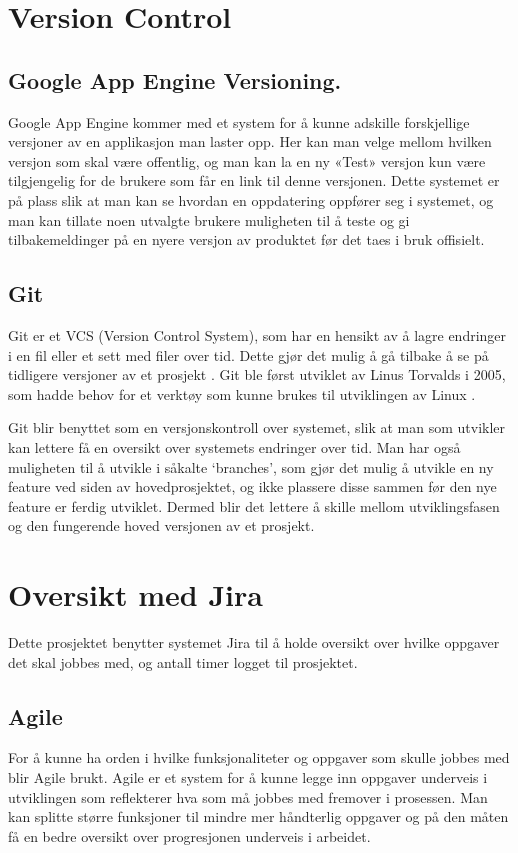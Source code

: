 \section{Version Control}
\subsection{Google App Engine Versioning.}
Google App Engine kommer med et system for å kunne adskille forskjellige versjoner av en applikasjon man laster opp. Her kan man velge mellom hvilken versjon som skal være offentlig, og man kan la en ny «Test» versjon kun være tilgjengelig for de brukere som får en link til denne versjonen. Dette systemet er på plass slik at man kan se hvordan en oppdatering oppfører seg i systemet, og man kan tillate noen utvalgte brukere muligheten til å teste og gi tilbakemeldinger på en nyere versjon av produktet før det taes i bruk offisielt.


\subsection{Git}
Git er et VCS (Version Control System), som har en hensikt av å lagre endringer i en fil eller et sett med filer over tid. Dette gjør det mulig å gå tilbake å se på tidligere versjoner av et prosjekt \citep{git:info}. Git ble først utviklet av Linus Torvalds i 2005, som hadde behov for et verktøy som kunne brukes til utviklingen av Linux \citep{git:history}. 


Git blir benyttet som en versjonskontroll over systemet, slik at man som utvikler kan lettere få en oversikt over systemets endringer over tid. Man har også muligheten til å utvikle i såkalte ‘branches’, som gjør det mulig å utvikle en ny feature ved siden av hovedprosjektet, og ikke plassere disse sammen før den nye feature er ferdig utviklet. Dermed blir det lettere å skille mellom utviklingsfasen og den fungerende hoved versjonen av et prosjekt.


\section{Oversikt med Jira}
Dette  prosjektet benytter systemet Jira til å holde oversikt over hvilke oppgaver det skal jobbes med, og antall timer logget  til prosjektet.

\subsection{Agile}
For å kunne ha orden i hvilke funksjonaliteter og oppgaver som skulle jobbes med blir Agile brukt. Agile er et system for å kunne legge inn oppgaver underveis i utviklingen som reflekterer hva som må jobbes med fremover i prosessen. Man kan splitte større funksjoner til mindre mer håndterlig oppgaver og på den måten få en bedre oversikt over progresjonen underveis i arbeidet.

